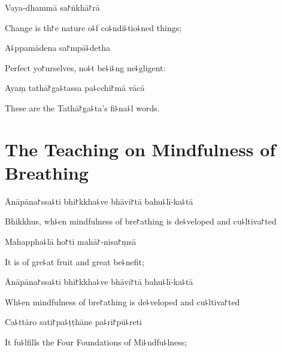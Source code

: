 Vaya-dhammā sa꜓ṅkhā꜓rā

\begin{english}
  Change is th꜓e nature o꜕f co꜕ndi꜕tio꜕ned things;
\end{english}

A꜕ppamādena sa꜓mpā꜕detha


\begin{english}
  Perfect yo꜓urselves, no꜕t be꜕i꜕ng ne꜕gligent:
\end{english}

Ayaṃ tathā꜓ga꜕tassa pa꜕cchi꜓mā vācā

\begin{english}
  These are the Tathā꜓ga꜕ta's fi꜕na꜕l words.
\end{english}

\chapter{The Teaching on Mindfulness of Breathing}%


\begin{leader}
\end{leader}

Ānāpāna꜓ssa꜕ti bhi꜓kkha꜕ve bhāvi꜓tā bahu꜕lī-ka꜕tā

\begin{english}
  Bhikkhus, wh꜕en mindfulness of bre꜓athing is de꜕veloped and cu꜕ltiva꜓ted
\end{english}

Mahappha꜕lā ho꜓ti mahā꜓-nisa꜓ṃsā

\begin{english}
  It is of gre꜕at fruit and great be꜕nefit;
\end{english}

Ānāpāna꜓ssa꜕ti bhi꜓kkha꜕ve bhāvi꜓tā bahu꜕lī-ka꜕tā

\begin{english}
  Wh꜕en mindfulness of bre꜓athing is de꜕veloped and cu꜕ltiva꜓ted
\end{english}

Ca꜕ttāro sati꜓pa꜕ṭṭhāne pa꜕ri꜓pū꜕reti

\begin{english}
  It fu꜕lfills the Four Foundations of Mi꜕ndfu꜕lness;
\end{english}

